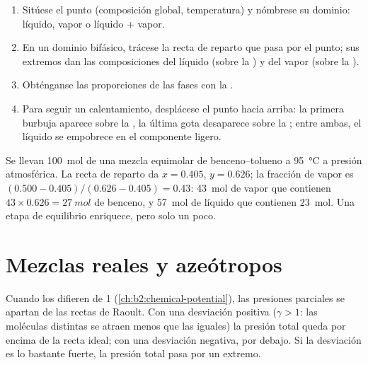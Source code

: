 \begin{method}\label{met:b2:liquid-vapour-diagrams:read-diagram}
\begin{enumerate}
  \item Sitúese el punto (composición global, temperatura) y nómbrese su
        dominio: líquido, vapor o líquido + vapor.
  \item En un dominio bifásico, trácese la recta de reparto que pasa por el punto; sus extremos
        dan las composiciones del líquido (sobre la ) y del
        vapor (sobre la ).
  \item Obténganse las proporciones de las fases con la .
  \item Para seguir un calentamiento, desplácese el punto hacia arriba: la primera burbuja aparece
        sobre la , la última gota desaparece sobre la ;
        entre ambas, el líquido se empobrece en el componente ligero.
\end{enumerate}
\end{method}

\begin{example}\label{ex:b2:liquid-vapour-diagrams:flash}
Se llevan \qty{100}{mol} de una mezcla equimolar de benceno--tolueno a
\qty{95}{\degreeCelsius} a presión atmosférica. La recta de reparto da $x =
0.405$, $y = 0.626$; la fracción de vapor es $(0.500 - 0.405)/(0.626 - 0.405) =
0.43$: \qty{43}{mol} de vapor que contienen $43 \times 0.626 = \qty{27}{mol}$ de
benceno, y \qty{57}{mol} de líquido que contienen \qty{23}{mol}. Una etapa de equilibrio
enriquece, pero solo un poco.
\end{example}

\section{Mezclas reales y azeótropos}

Cuando los  difieren de 1 (\cref{ch:b2:chemical-potential}),
las presiones parciales se apartan de las rectas de Raoult. Con una desviación
positiva ($\gamma > 1$: las moléculas distintas se atraen menos que las
iguales) la presión total queda por encima de la recta ideal; con una desviación negativa,
por debajo. Si la desviación es lo bastante fuerte, la presión total pasa por un
extremo.

